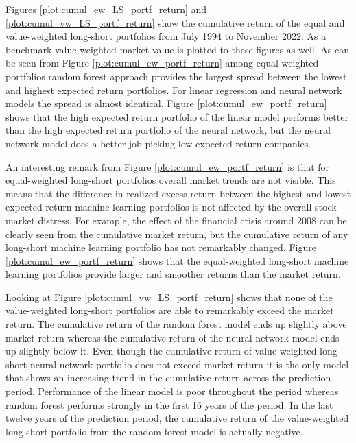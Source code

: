 \documentclass[12pt]{article}
\begin{document}
Figures \ref{plot:cumul_ew_LS_portf_return} and \ref{plot:cumul_vw_LS_portf_return} show the cumulative return of the equal and value-weighted long-short portfolios from July 1994 to November 2022. As a benchmark value-weighted market value is plotted to these figures as well. As can be seen from Figure \ref{plot:cumul_ew_portf_return} among equal-weighted portfolios random forest approach provides the largest spread between the lowest and highest expected return portfolios. For linear regression and neural network models the spread is almost identical. Figure \ref{plot:cumul_ew_portf_return} shows that the high expected return portfolio of the linear model performs better than the high expected return portfolio of the neural network, but the neural network model does a better job picking low expected return companies. \par

An interesting remark from Figure \ref{plot:cumul_ew_portf_return} is that for equal-weighted long-short portfolios overall market trends are not visible. This means that the difference in realized excess return between the highest and lowest expected return machine learning portfolios is not affected by the overall stock market distress. For example, the effect of the financial crisis around 2008 can be clearly seen from the cumulative market return, but the cumulative return of any long-short machine learning portfolio has not remarkably changed. Figure \ref{plot:cumul_ew_portf_return} shows that the equal-weighted long-short machine learning portfolios provide larger and smoother returns than the market return. \par

Looking at Figure \ref{plot:cumul_vw_LS_portf_return} shows that none of the value-weighted long-short portfolios are able to remarkably exceed the market return. The cumulative return of the random forest model ends up slightly above market return whereas the cumulative return of the neural network model ends up slightly below it. Even though the cumulative return of value-weighted long-short neural network portfolio does not exceed market return it is the only model that shows an increasing trend in the cumulative return across the prediction period. Performance of the linear model is poor throughout the period whereas random forest performs strongly in the first 16 years of the period. In the last twelve years of the prediction period, the cumulative return of the value-weighted long-short portfolio from the random forest model is actually negative. \par
\end{document}
